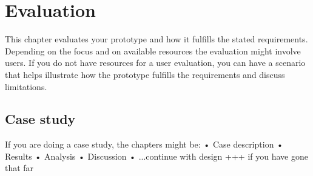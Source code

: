 \chapter{Evaluation}
This chapter evaluates your prototype and how it fulfills the
stated requirements. Depending on the focus and on available resources
the evaluation might involve users. If you do not have resources for a user
evaluation, you can have a scenario that helps illustrate how the prototype
fulfills the requirements and discuss limitations.

\section{Case study}
If you are doing a case study, the chapters might be:
• Case description
• Results
• Analysis
• Discussion
• ...continue with design +++ if you have gone that far